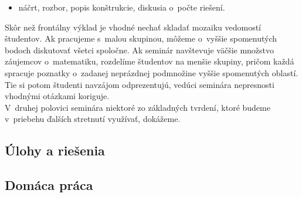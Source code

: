 {\begin{itemize}
\begin{itemize}
\item náčrt, rozbor, popis konštrukcie, diskusia o~počte riešení.
\end{itemize}
\end{itemize}
\kom Skôr než frontálny výklad je vhodné nechať skladať mozaiku vedomostí študentov. Ak pracujeme s~malou skupinou, môžeme o~vyššie spomenutých bodoch diskutovať všetci spoločne. Ak seminár navštevuje väčšie množstvo záujemcov o~matematiku, rozdelíme študentov na menšie skupiny, pričom každá spracuje poznatky o~zadanej neprázdnej podmnožine vyššie spomenutých oblastí. Tie si potom študenti navzájom odprezentujú, vedúci seminára nepresnosti vhodnými otázkami koriguje.
\\
\kom V~druhej polovici seminára niektoré zo základných tvrdení, ktoré budeme v~priebehu ďalších stretnutí využívať, dokážeme.\\
}

\subsection*{Úlohy a riešenia}

















\subsection*{Domáca práca}








